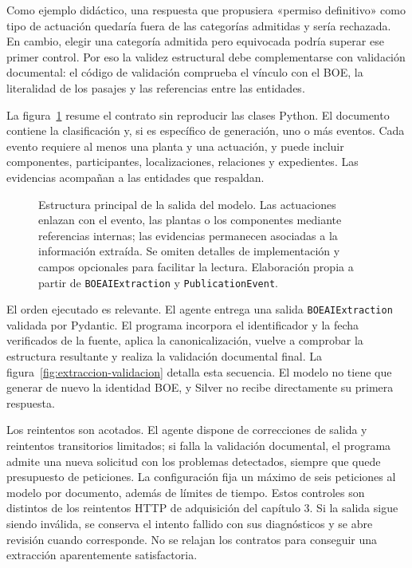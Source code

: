 Como ejemplo didáctico, una respuesta que propusiera «permiso definitivo»
como tipo de actuación quedaría fuera de las categorías admitidas y sería
rechazada. En cambio, elegir una categoría admitida pero equivocada podría
superar ese primer control. Por eso la validez estructural debe complementarse
con validación documental: el código de validación comprueba el vínculo con el BOE,
la literalidad de los pasajes y las referencias entre las entidades.

La figura~\ref{fig:contrato-extraccion} resume el contrato sin reproducir las
clases Python. El documento contiene la
clasificación y, si es específico de generación, uno o más eventos. Cada evento
requiere al menos una planta y una actuación, y puede incluir componentes,
participantes, localizaciones, relaciones y expedientes. Las evidencias
acompañan a las entidades que respaldan.

\begin{figure}[!htbp]
\centering

\caption[Contrato conceptual de extracción]{Estructura principal de la salida
del modelo. Las actuaciones enlazan con el evento, las plantas o los
componentes mediante referencias internas; las evidencias permanecen asociadas
a la información extraída. Se omiten detalles de implementación y campos
opcionales para facilitar la lectura. Elaboración propia a partir de
\texttt{BOEAIExtraction} y \texttt{PublicationEvent}.}
\label{fig:contrato-extraccion}
\end{figure}

El orden ejecutado es relevante. El agente entrega una salida
\texttt{BOEAIExtraction} validada por Pydantic. El programa incorpora el identificador y la fecha
verificados de la fuente, aplica la canonicalización, vuelve a comprobar la
estructura resultante y realiza la validación documental final. La
figura~\ref{fig:extraccion-validacion} detalla esta secuencia. El modelo no
tiene que generar de nuevo la identidad BOE, y Silver no recibe directamente
su primera respuesta.

Los reintentos son acotados. El agente dispone de correcciones de salida y
reintentos transitorios limitados; si falla la validación documental, el
programa admite una nueva solicitud con los problemas detectados, siempre
que quede presupuesto de peticiones. La configuración fija un máximo de seis
peticiones al modelo por documento, además de límites de tiempo. Estos
controles son distintos de los reintentos HTTP de adquisición del capítulo 3.
Si la salida sigue siendo inválida, se conserva el intento fallido con sus
diagnósticos y se abre revisión cuando corresponde. No se relajan los
contratos para conseguir una extracción aparentemente satisfactoria.

